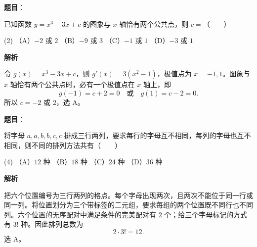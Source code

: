 \begin{answer}

\textbf{题目}：

已知函数 $y=x^3-3x+c$ 的图象与 $x$ 轴恰有两个公共点，则 $c=$\mbox{（　　）}

\begin{gkopts}(2)
\task （A）$-2$ 或 $2$
\task （B）$-9$ 或 $3$
\task （C）$-1$ 或 $1$
\task （D）$-3$ 或 $1$
\end{gkopts}

\textbf{解析}

令 $g(x)=x^3-3x+c$，则 $g'(x)=3(x^2-1)$，极值点为 $x=-1,1$。图象与 $x$ 轴恰有两个公共点时，必有一个极值点在 $x$ 轴上，即
\nopagebreak[4]
\[
g(-1)=c+2=0\quad\text{或}\quad g(1)=c-2=0.
\]
所以 $c=-2$ 或 $2$，选 A。


\end{answer}
\begin{answer}

\textbf{题目}：

将字母 $a,a,b,b,c,c$ 排成三行两列，要求每行的字母互不相同，每列的字母也互不相同，则不同的排列方法共有\mbox{（　　）}

\begin{gkopts}(4)
\task （A）$12$ 种
\task （B）$18$ 种
\task （C）$24$ 种
\task （D）$36$ 种
\end{gkopts}

\textbf{解析}

把六个位置编号为三行两列的格点。每个字母出现两次，且两次不能位于同一行或同一列。将位置划分为三个带标签的二元组，要求每组的两个位置既不同行也不同列。六个位置的无序配对中满足条件的完美配对有 $2$ 个；给三个字母标记的方式有 $3!$ 种。因此排列总数为
\nopagebreak[4]
\[
2\cdot3!=12.
\]
选 A。


\end{answer}
